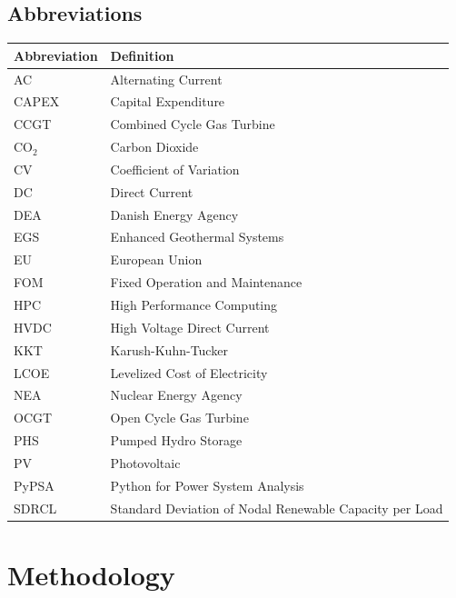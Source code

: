 \documentclass[preprint,12pt,nopreprintline]{elsarticle}
\begin{document}
\subsection*{Abbreviations}
\small
\begin{tabular}{ll}
\toprule
\textbf{Abbreviation} & \textbf{Definition} \\
\midrule
AC & Alternating Current \\
CAPEX & Capital Expenditure \\
CCGT & Combined Cycle Gas Turbine \\
CO$_2$ & Carbon Dioxide \\
CV & Coefficient of Variation \\
DC & Direct Current \\
DEA & Danish Energy Agency \\
EGS & Enhanced Geothermal Systems \\
EU & European Union \\
FOM & Fixed Operation and Maintenance \\
HPC & High Performance Computing \\
HVDC & High Voltage Direct Current \\
KKT & Karush-Kuhn-Tucker \\
LCOE & Levelized Cost of Electricity \\
NEA & Nuclear Energy Agency \\
OCGT & Open Cycle Gas Turbine \\
PHS & Pumped Hydro Storage \\
PV & Photovoltaic \\
PyPSA & Python for Power System Analysis \\
SDRCL & Standard Deviation of Nodal Renewable Capacity per Load \\
\bottomrule
\end{tabular}

\newpage
\section{Methodology}
\end{document}
